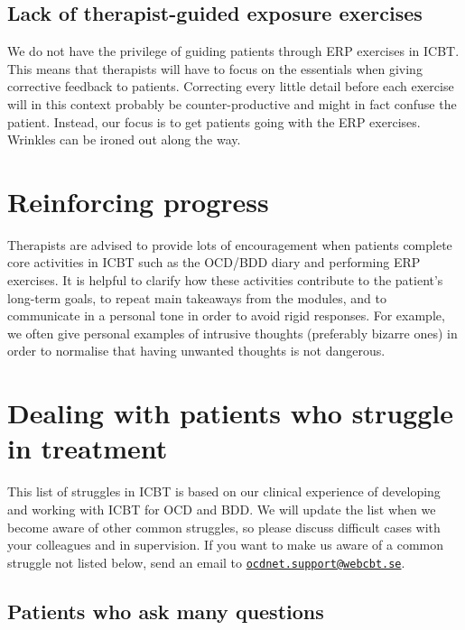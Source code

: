 \documentclass[]{book}
\theoremstyle{definition}
\theoremstyle{definition}
\theoremstyle{definition}
\theoremstyle{remark}
\begin{document}
\hypertarget{lack-of-therapist-guided-exposure-exercises}{%
\subsection{Lack of therapist-guided exposure
exercises}\label{lack-of-therapist-guided-exposure-exercises}}

We do not have the privilege of guiding patients through ERP exercises
in ICBT. This means that therapists will have to focus on the essentials
when giving corrective feedback to patients. Correcting every little
detail before each exercise will in this context probably be
counter-productive and might in fact confuse the patient. Instead, our
focus is to get patients going with the ERP exercises. Wrinkles can be
ironed out along the way.

\hypertarget{reinforcing-progress}{%
\section{Reinforcing progress}\label{reinforcing-progress}}

Therapists are advised to provide lots of encouragement when patients
complete core activities in ICBT such as the OCD/BDD diary and
performing ERP exercises. It is helpful to clarify how these activities
contribute to the patient's long-term goals, to repeat main takeaways
from the modules, and to communicate in a personal tone in order to
avoid rigid responses. For example, we often give personal examples of
intrusive thoughts (preferably bizarre ones) in order to normalise that
having unwanted thoughts is not dangerous.

\hypertarget{dealing-with-patients-who-struggle-in-treatment}{%
\section{Dealing with patients who struggle in
treatment}\label{dealing-with-patients-who-struggle-in-treatment}}

This list of struggles in ICBT is based on our clinical experience of
developing and working with ICBT for OCD and BDD. We will update the
list when we become aware of other common struggles, so please discuss
difficult cases with your colleagues and in supervision. If you want to
make us aware of a common struggle not listed below, send an email to
\href{mailto:ocdnet.support@webcbt.se}{\nolinkurl{ocdnet.support@webcbt.se}}.

\hypertarget{patients-who-ask-many-questions}{%
\subsection{Patients who ask many
questions}\label{patients-who-ask-many-questions}}
\end{document}
